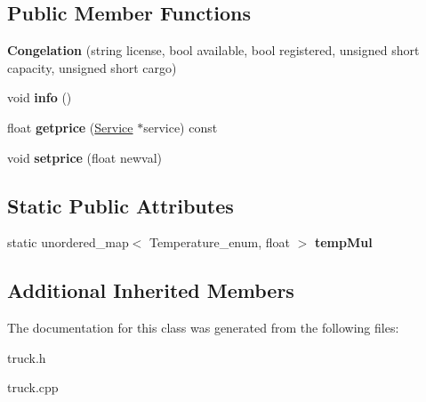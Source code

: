 \subsection*{Public Member Functions}
\begin{DoxyCompactItemize}
\item 
\mbox{\label{class_congelation_a320f8a45809dbe0d770f9f77d49b3629}} 
{\bfseries Congelation} (string license, bool available, bool registered, unsigned short capacity, unsigned short cargo)
\item 
\mbox{\label{class_congelation_ac2f7cb9aeeeb9428a9a973e6a2c63942}} 
void {\bfseries info} ()
\item 
\mbox{\label{class_congelation_a5a37727f0b16e4d250e4576c637392ea}} 
float {\bfseries getprice} (\hyperlink{class_service}{Service} $\ast$service) const
\item 
\mbox{\label{class_congelation_a8da05aa8ea57feefdcbd3bae457af06f}} 
void {\bfseries setprice} (float newval)
\end{DoxyCompactItemize}
\subsection*{Static Public Attributes}
\begin{DoxyCompactItemize}
\item 
\mbox{\label{class_congelation_aa0cf9fa825aa450ff04d58e5e733706b}} 
static unordered\+\_\+map$<$ Temperature\+\_\+enum, float $>$ {\bfseries temp\+Mul}
\end{DoxyCompactItemize}
\subsection*{Additional Inherited Members}


The documentation for this class was generated from the following files\+:\begin{DoxyCompactItemize}
\item 
truck.\+h\item 
truck.\+cpp\end{DoxyCompactItemize}
